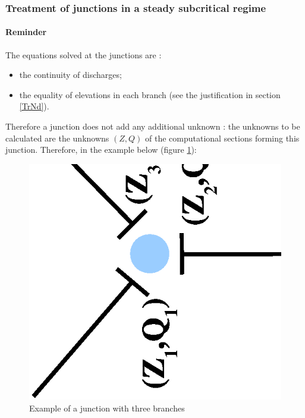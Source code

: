 \subsubsection{Treatment of junctions in a steady subcritical regime} \label{NdPERM}

\paragraph{Reminder\\}

\hspace*{1cm}

The equations solved at the junctions are :
\begin{itemize}
 \item the continuity of discharges;
 \item the equality of elevations in each branch (see the justification in section \ref{TrNd}).
\end{itemize}

\vspace{0.5cm}

Therefore a junction does not add any additional unknown : the unknowns to be calculated are the unknowns $(Z,Q)$ of the computational sections forming this junction. Therefore, in the example below (figure \ref{SchNd}):

\begin{figure}[h]
 \begin{center}
  \includegraphics[scale=0.6,angle=270]{Figures/Schema_noeud.eps}\hspace{1cm}
  \vspace{1cm}
  \caption{Example of a junction with three branches}
  \label{SchNd}
 \end{center}
\end{figure}


